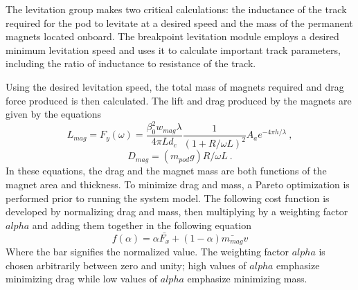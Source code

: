 	The levitation group makes two critical calculations: the inductance of the
	track required for the pod to levitate at a desired speed and the mass of
	the permanent magnets located onboard. The breakpoint levitation module employs a
	desired minimum levitation speed and uses it to calculate important track
	parameters, including the ratio of inductance to resistance of the track.

	Using the desired levitation speed, the total mass of magnets required and
	drag force produced is then calculated. The lift and drag produced
	by the magnets are given by the equations
	\begin{equation}
		\label{eq:fy_lev}
		L_{mag} = F_{y}(\omega)=\frac{\beta _{0}^{2}w_{mag}\lambda}{4\pi Ld_{c}}\frac{1}{(1+R/\omega L)^{2}}A_ae^{-4\pi h/\lambda } \ ,
	\end{equation}
	\begin{equation}
		\label{eq:dmag}
		D_{mag}=( m_{pod}g)R/\omega L \ .
	\end{equation}
	In these equations, the drag and the magnet mass are both functions of the
	magnet area and thickness. To minimize drag and mass, a Pareto optimization
	is performed prior to running the system model. The following cost function
	is developed by normalizing drag and mass, then multiplying by a weighting
	factor $alpha$ and adding them together in the following equation
	\begin{equation}
		\label{eq:pareto}
		f(\alpha ) = \alpha \bar{F_{x}} + (1-\alpha )\bar{m_{mag}}v
	\end{equation}
	Where the bar signifies the normalized value. The weighting factor $alpha$
	is chosen arbitrarily between zero and unity; high values of $alpha$
	emphasize minimizing drag while low values of $alpha$ emphasize minimizing mass.




